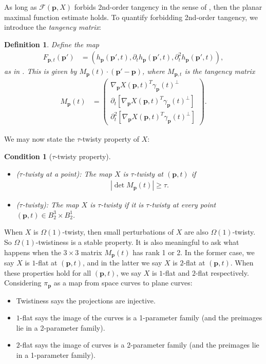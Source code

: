\documentclass[12pt]{amsart}
\numberwithin{equation}{section}
\newtheorem{definition}[lemma]{Definition}
\newtheorem{condition}{Condition}
\newcommand{\1}{\mathbbm{1}}
\newcommand{\p}{\mathbf p}
\begin{document}
As long as $\mathcal F(\p,X)$ forbids 2nd-order tangency in the sense of \cite[Definition 1.8]{zahlPlanar}, then the planar maximal function estimate \cite[Theorem 1.9]{zahlPlanar} holds. To quantify forbidding 2nd-order tangency, we introduce the \emph{tangency matrix}: 

\begin{definition}\label{def: tang matrix}
    Define the map
    \begin{align}
        F_{\p,t}(\p') &= (h_\p(\p',t), \partial_t h_\p(\p',t), \partial_t^2 h_\p(\p',t)),
    \end{align}
    as in \cite[Definition 1.1]{zahlPlanar}.
    This is given by $M_{\p}(t) \cdot (\p' - \p)$, 
    where $M_{\p,t}$ is the \emph{tangency matrix} 
    \begin{align}\label{eq: tangency matrix}
        M_{\p}(t) &= 
        \begin{pmatrix}
        \nabla_\p X(\p,t)^T \gamma_\p(t)^\perp \\
        \partial_t[\nabla_\p X(\p,t)^T \gamma_\p(t)^\perp] \\
        \partial_t^2[\nabla_\p X(\p,t)^T \gamma_\p(t)^\perp] 
    \end{pmatrix}.
    \end{align}
\end{definition}
We may now state the $\tau$-twisty property of $X$: 
\begin{condition}[$\tau$-twisty property]\label{cond: twisty}
    \begin{itemize}\hfill
        \item ($\tau$-twisty at a point): The map $X$ is $\tau$-twisty at $(\p,t)$ if 
        \begin{align}
            |\det M_{\p}(t)| \geq \tau. 
        \end{align}
        \item ($\tau$-twisty): The map $X$ is $\tau$-twisty if it is $\tau$-twisty at every point $(\p,t) \in B_2^3 \times B_2^1$.
    \end{itemize}
\end{condition}
When $X$ is $\Omega(1)$-twisty, then small perturbations of $X$ are also $\Omega(1)$-twisty. So $\Omega(1)$-twistiness is a stable property. It is also meaningful to ask what happens when the $3 \times 3$ matrix $M_{\p}(t)$ has rank 1 or 2. In the former case, we say $X$ is $1$-flat at $(\p,t)$, and in the latter we say $X$ is $2$-flat at $(\p,t)$. When these properties hold for all $(\p,t)$, we say $X$ is $1$-flat and $2$-flat respectively. Considering $\pi_\p$ as a map from space curves to plane curves: 
\begin{itemize}
    \item Twistiness says the projections are injective.
    \item $1$-flat says the image of the curves is a 1-parameter family (and the preimages lie in a 2-parameter family). 
    \item $2$-flat says the image of curves is a 2-parameter family (and the preimages lie in a 1-parameter family).
\end{itemize}
\end{document}

